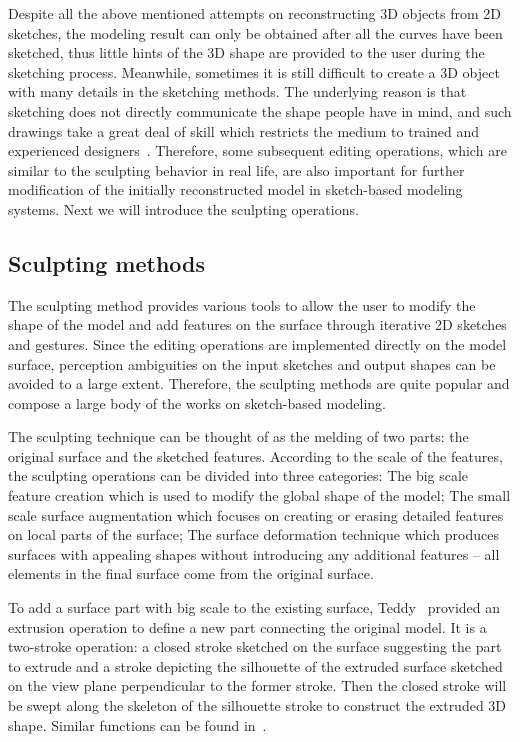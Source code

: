 Despite all the above mentioned attempts on  reconstructing 3D
objects from 2D sketches, the modeling result can only be obtained
after all the curves have been sketched, thus little hints of the 3D
shape are provided to the user during the sketching process.
Meanwhile, sometimes it is still difficult to create a 3D object
with many details in the sketching methods. The underlying reason is
that sketching does not directly communicate the shape people have
in mind, and such drawings take a great deal of skill which
restricts the medium to trained and experienced
designers~\cite{CIW08}. Therefore, some subsequent editing
operations, which are similar to the sculpting behavior in real
life, are also important for further modification of the initially
reconstructed model in sketch-based modeling systems. Next we will
introduce the sculpting operations.


\subsection{Sculpting methods}
\label{ch2:sec:sbim:sculpt}

The sculpting method provides various tools to  allow the user to
modify the shape of the model and add features on the surface
through iterative 2D sketches and gestures. Since the editing
operations are implemented directly on the model surface, perception
ambiguities on the input sketches and output shapes can be avoided
to a large extent. Therefore, the sculpting methods are quite
popular and compose a large body of the works on sketch-based
modeling.

The sculpting technique can be thought of as the  melding of two
parts: the original surface and the sketched features. According to
the scale of the features, the sculpting operations can be divided
into three categories: The big scale feature creation which is used
to modify the global shape of the model; The small scale surface
augmentation which focuses on creating or erasing detailed features
on local parts of the surface; The surface deformation technique
which produces surfaces with appealing shapes without introducing
any additional features -- all elements in the final surface come
from the original surface.

To add a surface part with big scale to the existing  surface,
Teddy~\cite{IMT99} provided an extrusion operation to define a new
part connecting the original model. It is a two-stroke operation: a
closed stroke sketched on the surface suggesting the part to extrude
and a stroke depicting the silhouette of the extruded surface
sketched on the view plane perpendicular to the former stroke. Then
the closed stroke will be swept along the skeleton of the silhouette
stroke to construct the extruded 3D shape. Similar functions can be
found in~\cite{NISA07,MI07,WM07}.


